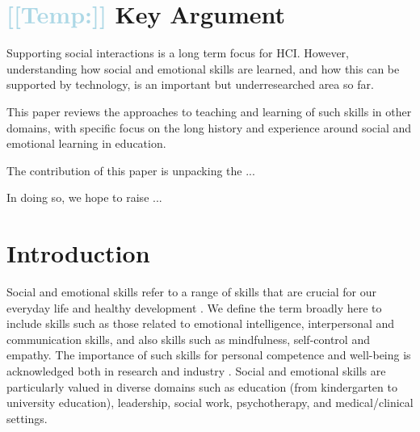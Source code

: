 \documentclass[prodmode,acmtochi]{acmsmall}
\newcommand{\todo}[1]{\textrm{\textrm{\textcolor{LightBlue}{[[#1]]} } } }
\begin{document}

\section{\todo{Temp:} Key Argument}


Supporting social interactions is a long term focus for HCI. However, understanding how social and emotional skills are learned, and how this can be supported by technology, is an important but underresearched area so far. 

This paper reviews the approaches to teaching and learning of such skills in other domains, with specific focus on the long history and experience around social and emotional learning in education. 

The contribution of this paper is unpacking the ... 

In doing so, we hope to raise ... 








\section{Introduction}
 
 
Social and emotional skills refer to a range of skills that are crucial for our everyday life and healthy development \cite{Weare2011,Adi2007a,Damon2006}. We define the term broadly here to include skills such as those related to emotional intelligence, interpersonal and communication skills, and also skills such as mindfulness, self-control and empathy. The importance of such skills for personal competence and well-being is acknowledged both in research and industry \cite{Durlak2011,Greenberg2010,Stepien2006,Barth2011,Carey2011,Bono2009}. Social and emotional skills are particularly valued in diverse domains such as education (from kindergarten to university education), leadership, social work, psychotherapy, and medical/clinical settings. 
\end{document}
